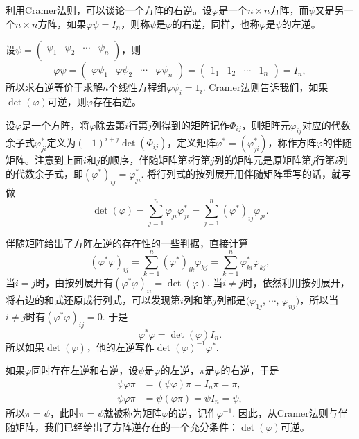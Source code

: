 \para 利用Cramer法则，可以谈论一个方阵的右逆。设$\varphi$是一个$n\times n$方阵，而$\psi$又是另一个$n\times n$方阵，如果$\varphi\psi=I_n$，则称$\psi$是$\varphi$的右逆，同样，也称$\varphi$是$\psi$的左逆。

设$\psi=\begin{pmatrix}\psi_{1} & \psi_{2} & \cdots & \psi_{n}\\\end{pmatrix}$，则
\[
	\varphi\psi=\begin{pmatrix}\varphi\psi_{1} & \varphi\psi_{2} & \cdots & \varphi\psi_{n}\end{pmatrix}=\begin{pmatrix}1_{1} & 1_{2} & \cdots & 1_{n}\end{pmatrix}=I_n,
\]
所以求右逆等价于求解$n$个线性方程组$\varphi\psi_i=1_i$. Cramer法则告诉我们，如果$\det(\varphi)$可逆，则$\varphi$存在右逆。

\para 设$\varphi$是一个方阵，将$\varphi$除去第$i$行第$j$列得到的矩阵记作$\Phi_{ij}$，则矩阵元$\varphi_{ij}$对应的代数余子式$\varphi_{ji}^*$定义为$(-1)^{i+j}\det(\Phi_{ij})$，定义矩阵$\varphi^*=(\varphi_{ji}^*)$，称作方阵$\varphi$的伴随矩阵。注意到上面$i$和$j$的顺序，伴随矩阵第$i$行第$j$列的矩阵元是原矩阵第$j$行第$i$列的代数余子式，即$(\varphi^*)_{ij}=\varphi_{ji}^*$. 将行列式的按列展开用伴随矩阵重写的话，就写做
\[
	\det(\varphi)=\sum_{j=1}^n\varphi_{ji}\varphi_{ji}^*=\sum_{j=1}^n(\varphi^*)_{ij}\varphi_{ji}.
\]

伴随矩阵给出了方阵左逆的存在性的一些判据，直接计算
\[
	(\varphi^*\varphi)_{ij}=\sum_{k=1}^n(\varphi^*)_{ik}\varphi_{kj}=\sum_{k=1}^n\varphi^*_{ki}\varphi_{kj},
\]
当$i=j$时，由按列展开有$(\varphi^*\varphi)_{ii}=\det(\varphi)$. 当$i\neq j$时，依然利用按列展开，将右边的和式还原成行列式，可以发现第$i$列和第$j$列都是$(\varphi_{1j}$, $\cdots$, $\varphi_{nj})$，所以当$i\neq j$时有$(\varphi^*\varphi)_{ij}=0$. 于是
\[
	\varphi^*\varphi=\det(\varphi)I_n.
\]
所以如果$\det(\varphi)$，他的左逆写作$\det(\varphi)^{-1}\varphi^*$.

\para 如果$\varphi$同时存在左逆和右逆，设$\psi$是$\varphi$的左逆，$\pi$是$\varphi$的右逆，于是
\[
\begin{aligned}
	\psi\varphi\pi&=(\psi\varphi)\pi=I_n \pi=\pi,\\
	\psi\varphi\pi&=\psi(\varphi\pi)=\psi I_n=\psi,
\end{aligned}
\]
所以$\pi=\psi$，此时$\pi=\psi$就被称为矩阵$\varphi$的逆，记作$\varphi^{-1}$. 因此，从Cramer法则与伴随矩阵，我们已经给出了方阵逆存在的一个充分条件：$\det(\varphi)$可逆。

